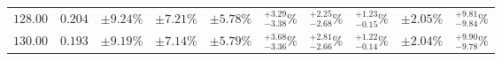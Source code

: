 \begin{table}[ht!]
{{\begin{tabular}{| cc | ccc | cccc | c |}
$128.00$ & $0.204$ & $\pm9.24\%$ & {\color{black!55}$\pm 7.21\%$} & {\color{black!55}$\pm 5.78\%$} & $^{+3.29}_{-3.38}\%$ & {\color{black!55}$^{+2.25}_{-2.68}\%$} & {\color{black!55}$^{+1.23}_{-0.15}\%$} & {\color{black!55}$\pm 2.05\%$} & $^{+9.81}_{-9.84}\%$  \\
$130.00$ & $0.193$ & $\pm9.19\%$ & {\color{black!55}$\pm 7.14\%$} & {\color{black!55}$\pm 5.79\%$} & $^{+3.68}_{-3.36}\%$ & {\color{black!55}$^{+2.81}_{-2.66}\%$} & {\color{black!55}$^{+1.22}_{-0.14}\%$} & {\color{black!55}$\pm 2.04\%$} & $^{+9.90}_{-9.78}\%$  \\
\cline{1-10}
\end{tabular}
}
}
\end{table}

